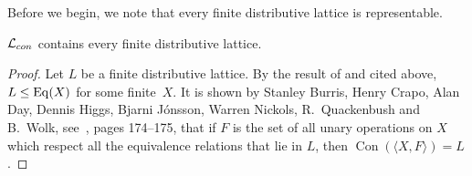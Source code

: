 Before we begin, we note that every finite distributive lattice
is representable.

\begin{theorem}
$\mathcal{L}_{con}$ contains every finite distributive lattice. 
\end{theorem}

\begin{proof}
Let $L$ be a finite distributive lattice. By the result of 
\Pudlak and \Tuma cited above, $L \le \operatorname{Eq}(X)$ for some finite~$X$.
It is shown by Stanley Burris, Henry Crapo, Alan Day, 
Dennis Higgs, Bjarni J\'onsson, Warren Nickols,
R.~Quackenbush and B.~Wolk, see~\cite{Jonsson:1972}, pages 174--175, 
that if $F$ is the set of all unary operations on $X$ which respect
all the equivalence relations that lie in $L$, then
$\operatorname{Con}(\langle X,F \rangle) = L$. 
\end{proof}


